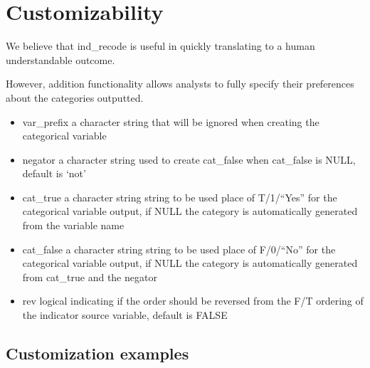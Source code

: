 \hypertarget{customizability}{%
\section{Customizability}\label{customizability}}

We believe that ind\_recode is useful in quickly translating to a human
understandable outcome.

However, addition functionality allows analysts to fully specify their
preferences about the categories outputted.

\begin{itemize}
\tightlist
\item
  var\_prefix a character string that will be ignored when creating the
  categorical variable
\item
  negator a character string used to create cat\_false when cat\_false
  is NULL, default is `not'
\item
  cat\_true a character string string to be used place of T/1/``Yes''
  for the categorical variable output, if NULL the category is
  automatically generated from the variable name
\item
  cat\_false a character string string to be used place of F/0/``No''
  for the categorical variable output, if NULL the category is
  automatically generated from cat\_true and the negator
\item
  rev logical indicating if the order should be reversed from the F/T
  ordering of the indicator source variable, default is FALSE
\end{itemize}

\hypertarget{customization-examples}{%
\subsection{Customization examples}\label{customization-examples}}

